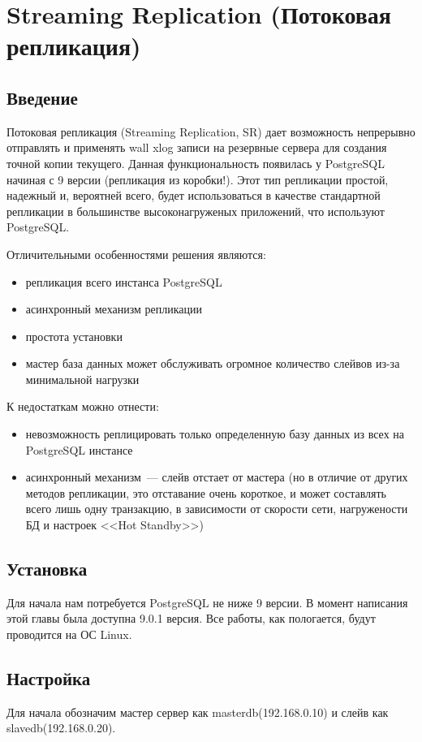 \section{Streaming Replication (Потоковая репликация)}
\subsection{Введение}
Потоковая репликация (Streaming Replication, SR) дает возможность непрерывно отправлять и применять 
wall xlog записи на резервные сервера для создания точной копии текущего. Данная функциональность 
появилась у PostgreSQL начиная с 9 версии (репликация из коробки!). Этот тип репликации простой, надежный и, вероятней всего,  
будет использоваться в качестве стандартной репликации в большинстве высоконагруженых приложений, что используют PostgreSQL. 

Отличительными особенностями решения являются:
\begin{itemize}
\item репликация всего инстанса PostgreSQL
\item асинхронный механизм репликации
\item простота установки
\item мастер база данных может обслуживать огромное количество слейвов из-за минимальной нагрузки
\end{itemize}

К недостаткам можно отнести:
\begin{itemize}
\item невозможность реплицировать только определенную базу данных из всех на PostgreSQL инстансе
\item асинхронный механизм~--- слейв отстает от мастера (но в отличие от других методов репликации, 
это отставание очень короткое, и может составлять всего лишь одну транзакцию, в зависимости от скорости сети, 
нагружености БД и настроек <<Hot Standby>>)
\end{itemize}

\subsection{Установка}
Для начала нам потребуется PostgreSQL не ниже 9 версии. В момент написания этой главы была доступна 9.0.1 версия. 
Все работы, как пологается, будут проводится на ОС Linux. 

\subsection{Настройка}
Для начала обозначим мастер сервер как masterdb(192.168.0.10) и слейв как slavedb(192.168.0.20).


